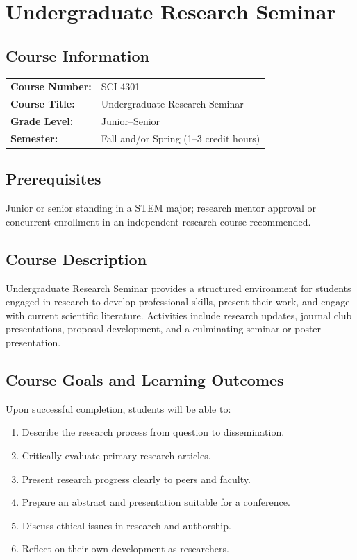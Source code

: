 \documentclass[12pt,oneside]{book}
\begin{document}
\chapter{Undergraduate Research Seminar}

\section{Course Information}

\begin{tabular}{ll}
\textbf{Course Number:} & SCI 4301 \\
\textbf{Course Title:} & Undergraduate Research Seminar \\
\textbf{Grade Level:} & Junior--Senior \\
\textbf{Semester:} & Fall and/or Spring (1–3 credit hours) \\
\end{tabular}

\section{Prerequisites}

Junior or senior standing in a STEM major; research mentor approval or concurrent enrollment in an independent research course recommended.

\section{Course Description}

Undergraduate Research Seminar provides a structured environment for students engaged in research to develop professional skills, present their work, and engage with current scientific literature. Activities include research updates, journal club presentations, proposal development, and a culminating seminar or poster presentation.

\section{Course Goals and Learning Outcomes}

Upon successful completion, students will be able to:

\begin{enumerate}
    \item Describe the research process from question to dissemination.
    \item Critically evaluate primary research articles.
    \item Present research progress clearly to peers and faculty.
    \item Prepare an abstract and presentation suitable for a conference.
    \item Discuss ethical issues in research and authorship.
    \item Reflect on their own development as researchers.
\end{enumerate}
\end{document}
